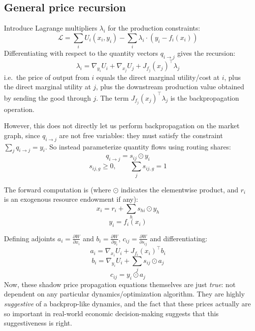 \subsection{General price recursion}\label{agency:sec:price-recursion}

Introduce Lagrange multipliers $\lambda_i$ for the production constraints:
\[\mathcal L = \sum_i U_i(x_i,y_i) -\sum_i \lambda_i\cdot (y_i-f_i(x_i))\]
Differentiating with respect to the quantity vectors $q_{i\to j}$ gives the recursion:
\begin{equation}
\lambda_i=\nabla_{y_i}U_i+\nabla_{x_j}U_j+J_{f_j}(x_j)^\top\lambda_j\label{agency:eq:lambda-recursion}
\end{equation}
i.e.\ the price of output from $i$ equals the direct marginal utility/cost at $i$, plus the
direct marginal utility at $j$, plus the downstream production value obtained by sending the
good through $j$. The term $J_{f_j}(x_j)^\top\lambda_j$ is the backpropagation operation.

However, this does not directly let us perform backpropagation on the market graph, since
$q_{i\to j}$ are not free variables: they must satisfy the constraint
$\sum_j q_{i\to j}=y_i$. So instead parameterize quantity flows using routing shares:
\[q_{i\to j}=s_{ij}\odot y_i\]
\[s_{ij,g}\geq 0,\qquad \sum_j s_{ij,g}=1\]

The forward computation is (where $\odot$ indicates the elementwise product, and $r_i$ is an
exogenous resource endowment if any):
\[x_i = r_i+\sum_h s_{hi}\odot y_h\]
\[y_i=f_i(x_i)\]

Defining adjoints $a_i=\frac{\partial W}{\partial x_i}$ and
$b_i=\frac{\partial W}{\partial y_i}$, $c_{ij}=\frac{\partial W}{\partial s_{ij}}$ and
differentiating:
\begin{equation}
a_i=\nabla_{x_i}U_i+J_{f_i}(x_i)^\top b_i\label{agency:eq:adjoint-a}
\end{equation}
\begin{equation}
b_i=\nabla_{y_i}U_i+\sum_j s_{ij}\odot a_j\label{agency:eq:adjoint-b}
\end{equation}
\begin{equation}
c_{ij} = y_i\odot a_j\label{agency:eq:share-gradient}
\end{equation}
Now, these shadow price propagation equations themselves are just \emph{true}: not dependent
on any particular dynamics/optimization algorithm. They are highly \emph{suggestive} of a
backprop-like dynamics, and the fact that these prices actually are so important in
real-world economic decision-making suggests that this suggestiveness is right.

